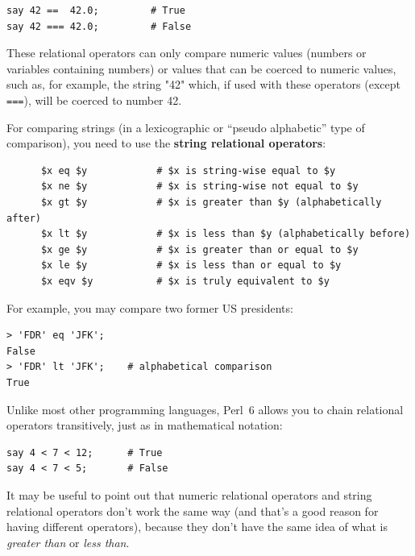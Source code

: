 \begin{verbatim}
say 42 ==  42.0;         # True
say 42 === 42.0;         # False
\end{verbatim}
%


These relational operators can only compare numeric values
(numbers or variables containing numbers) or values that 
can be coerced to numeric values, such as, for example, 
the string "42" which, if used with these operators 
(except {\tt ===}), will be coerced to number 42.

For comparing strings (in a lexicographic or ``pseudo alphabetic'' type of comparison), you need to use the {\bf string relational operators}:

\begin{verbatim}
      $x eq $y            # $x is string-wise equal to $y
      $x ne $y            # $x is string-wise not equal to $y
      $x gt $y            # $x is greater than $y (alphabetically after)
      $x lt $y            # $x is less than $y (alphabetically before)
      $x ge $y            # $x is greater than or equal to $y
      $x le $y            # $x is less than or equal to $y
      $x eqv $y           # $x is truly equivalent to $y
\end{verbatim}
%  



For example, you may compare two former US presidents:
\begin{verbatim}
> 'FDR' eq 'JFK';
False
> 'FDR' lt 'JFK';    # alphabetical comparison
True
\end{verbatim}
%  

Unlike most other programming languages, Perl~6 allows you to chain relational operators transitively, just as in mathematical notation:

\begin{verbatim}
say 4 < 7 < 12;      # True
say 4 < 7 < 5;       # False
\end{verbatim}

It may be useful to point out that numeric relational operators 
and string relational operators don't work the same way (and 
that's a good reason for having different operators), because 
they don't have the same idea of what is \emph{greater than} 
or \emph{less than}.

